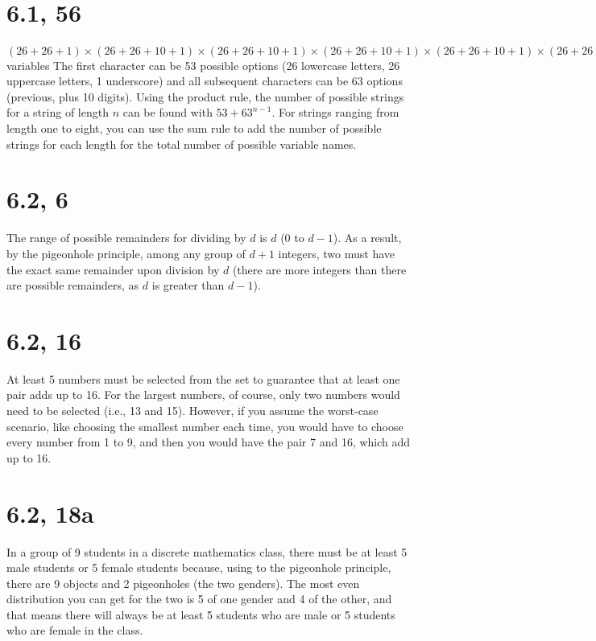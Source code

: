 \documentclass{article}
\begin{document}
\section{6.1, 56}
$(26 + 26 + 1) \times (26 + 26 + 10 + 1) \times (26 + 26 + 10 + 1) \times (26 + 26 + 10 + 1) \times (26 + 26 + 10 + 1) \times (26 + 26 + 10 + 1) \times (26 + 26 + 10 + 1) \times (26 + 26 + 10 + 1) + (26 + 26 + 1) \times (26 + 26 + 10 + 1) \times (26 + 26 + 10 + 1) \times (26 + 26 + 10 + 1) \times (26 + 26 + 10 + 1) \times (26 + 26 + 10 + 1) \times (26 + 26 + 10 + 1) + (26 + 26 + 1) \times (26 + 26 + 10 + 1) \times (26 + 26 + 10 + 1) \times (26 + 26 + 10 + 1) \times (26 + 26 + 10 + 1) \times (26 + 26 + 10 + 1) + (26 + 26 + 1) \times (26 + 26 + 10 + 1) \times (26 + 26 + 10 + 1) \times (26 + 26 + 10 + 1) \times (26 + 26 + 10 + 1) + (26 + 26 + 1) \times (26 + 26 + 10 + 1) \times (26 + 26 + 10 + 1) \times (26 + 26 + 10 + 1) + (26 + 26 + 1) \times (26 + 26 + 10 + 1) \times (26 + 26 + 10 + 1) + (26 + 26 + 1) \times (26 + 26 + 10 + 1) + (26 + 26 + 1) = 2.12132159 \times 10^{14}$ variables
\newline
The first character can be 53 possible options (26 lowercase letters, 26 uppercase letters, 1 underscore) and all subsequent characters can be 63 options (previous, plus 10 digits). Using the product rule, the number of possible strings for a string of length $n$ can be found with $53 + 63^{n - 1}$. For strings ranging from length one to eight, you can use the sum rule to add the number of possible strings for each length for the total number of possible variable names.

\section{6.2, 6}
The range of possible remainders for dividing by $d$ is $d$ (0 to $d - 1$). As a result, by the pigeonhole principle, among any group of $d + 1$ integers, two must have the exact same remainder upon division by $d$ (there are more integers than there are possible remainders, as $d$ is greater than $d - 1$).

\section{6.2, 16}
At least 5 numbers must be selected from the set to guarantee that at least one pair adds up to 16. For the largest numbers, of course, only two numbers would need to be selected (i.e., 13 and 15). However, if you assume the worst-case scenario, like choosing the smallest number each time, you would have to choose every number from 1 to 9, and then you would have the pair 7 and 16, which add up to 16.

\section{6.2, 18a}
In a group of 9 students in a discrete mathematics class, there must be at least 5 male students or 5 female students because, using to the pigeonhole principle, there are 9 objects and 2 pigeonholes (the two genders). The most even distribution you can get for the two is 5 of one gender and 4 of the other, and that means there will always be at least 5 students who are male or 5 students who are female in the class.
\end{document}
